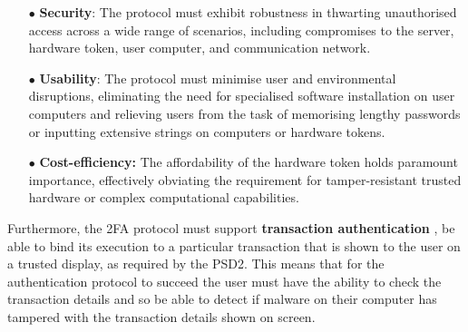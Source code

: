 \begin{itemize}[leftmargin=4.6mm]

\item[$\bullet$]\textbf{Security}: The protocol must exhibit robustness in thwarting unauthorised access across a wide range of scenarios, including compromises to the server, hardware token, user computer, and communication network.



\item[$\bullet$]\textbf{Usability}: The protocol must minimise user and environmental disruptions, eliminating the need for specialised software installation on user computers and relieving users from the task of memorising lengthy passwords or inputting extensive strings on computers or hardware tokens.

%

\item[$\bullet$]\textbf{Cost-efficiency:} The affordability of the hardware token holds paramount importance, effectively obviating the requirement for tamper-resistant trusted hardware or complex computational capabilities.



\end{itemize}

Furthermore, the 2FA protocol must support \textbf{transaction authentication} \ie, be able to bind its execution to a particular transaction that is shown to the user on a trusted display, as required by the PSD2.
This means that for the authentication protocol to succeed the user must have the ability to check the transaction details and so be able to detect if malware on their computer has tampered with the transaction details shown on screen.



